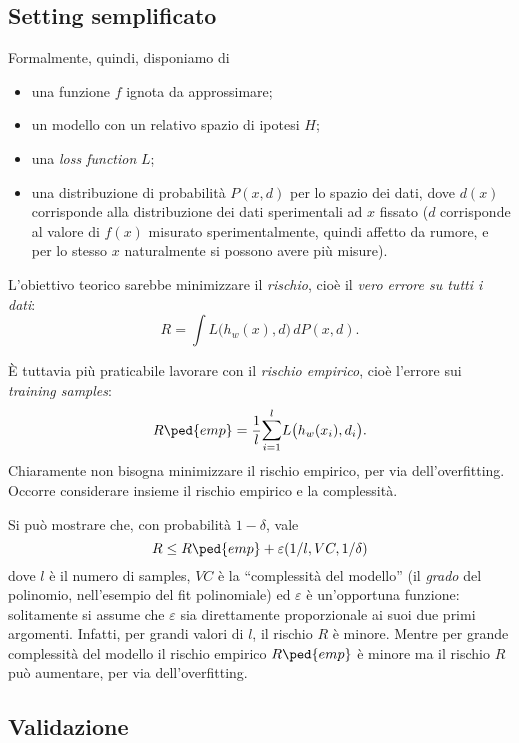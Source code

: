 \subsection{Setting semplificato}

Formalmente, quindi, disponiamo di
\begin{itemize}
\item una funzione $f$ ignota da approssimare;
\item un modello con un relativo spazio di ipotesi $H$;
\item una \emph{loss function} $L$;
\item una distribuzione di probabilità $P(x,d)$ per lo spazio dei dati, dove $d(x)$ corrisponde alla distribuzione dei dati sperimentali ad $x$ fissato ($d$ corrisponde al valore di $f(x)$ misurato sperimentalmente, quindi affetto da rumore, e per lo stesso $x$ naturalmente si possono avere più misure).
\end{itemize}
L'obiettivo teorico sarebbe minimizzare il \emph{rischio}, cioè il \emph{vero errore su tutti i dati}:
\begin{equation}
R=\int L\big(h_w(x),d\big)\,dP(x,d).
\end{equation}

È tuttavia più praticabile lavorare con il \emph{rischio empirico}, cioè l'errore sui \emph{training samples}:
\begin{equation}
R\ped{emp}=\frac{1}{l}\sum_{i=1}^l L\big(h_w(x_i),d_i\big).
\end{equation}
Chiaramente non bisogna minimizzare il rischio empirico, per via dell'overfitting. Occorre considerare insieme il rischio empirico e la complessità.

Si può mostrare che, con probabilità $1-\delta$, vale
\begin{equation}
R\le R\ped{emp} + \varepsilon(1/l, VC, 1/\delta)
\end{equation}
dove $l$ è il numero di samples, $VC$ è la “complessità del modello” (il \emph{grado} del polinomio, nell'esempio del fit polinomiale) ed $\varepsilon$ è un'opportuna funzione: solitamente si assume che $\varepsilon$ sia direttamente proporzionale ai suoi due primi argomenti. Infatti, per grandi valori di $l$, il rischio $R$ è minore. Mentre per grande complessità del modello il rischio empirico $R\ped{emp}$ è minore ma il rischio $R$ può aumentare, per via dell'overfitting.

\subsection{Validazione}

